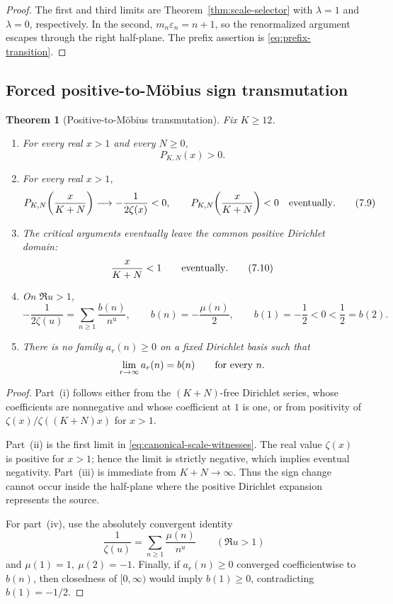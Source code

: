 \documentclass[11pt]{article}
\newtheorem{theorem}{Theorem}[section]
\theoremstyle{definition}
\theoremstyle{remark}
\begin{document}
\begin{proof}
The first and third limits are Theorem~\ref{thm:scale-selector} with
\(\lambda=1\) and \(\lambda=0\), respectively.  In the second,
\(m_n\varepsilon_n=n+1\), so the renormalized argument escapes through the right half-plane.
The prefix assertion is \eqref{eq:prefix-transition}.
\end{proof}

\subsection{Forced positive-to-M\"obius sign transmutation}

\begin{theorem}[Positive-to-M\"obius transmutation]\label{thm:positive-mobius}
Fix \(K\geq12\).
\begin{enumerate}[label=\textup{(\roman*)}]
\item For every real \(x>1\) and every \(N\geq0\),
\[
 P_{K,N}(x)>0.
 \]
\item For every real \(x>1\),
\begin{equation}
 P_{K,N}\!\left(\frac{x}{K+N}\right)
 \longrightarrow-\frac1{2\zeta(x)}<0,
 \qquad
 P_{K,N}\!\left(\frac{x}{K+N}\right)<0
 \quad\hbox{eventually}.
 \label{eq:positive-mobius-sign}
 \tag{7.9}
\end{equation}
\item The critical arguments eventually leave the common positive Dirichlet domain:
\[
 \frac{x}{K+N}<1\qquad\hbox{eventually}.
 \tag{7.10}
\]
\item On \(\Re u>1\),
\begin{equation}
 -\frac1{2\zeta(u)}
 =\sum_{n\geq1}\frac{b(n)}{n^u},
 \qquad
 b(n)=-\frac{\mu(n)}2,
 \qquad
 b(1)=-\frac12<0<\frac12=b(2).
 \label{eq:mobius-boundary-series}
 \tag{7.11}
\end{equation}
\item There is no family \(a_r(n)\geq0\) on a fixed Dirichlet basis such that
\[
 \lim_{r\to\infty}a_r(n)=b(n)
 \qquad\hbox{for every }n.
 \]
\end{enumerate}
\end{theorem}

\begin{proof}
Part~\textup{(i)} follows either from the \((K+N)\)-free Dirichlet series, whose coefficients
are nonnegative and whose coefficient at \(1\) is one, or from positivity of
\(\zeta(x)/\zeta((K+N)x)\) for \(x>1\).

Part~\textup{(ii)} is the first limit in
\eqref{eq:canonical-scale-witnesses}.  The real value \(\zeta(x)\) is positive for \(x>1\);
hence the limit is strictly negative, which implies eventual negativity.  Part~\textup{(iii)}
is immediate from \(K+N\to\infty\).  Thus the sign change cannot occur inside the half-plane
where the positive Dirichlet expansion represents the source.

For part~\textup{(iv)}, use the absolutely convergent identity
\[
 \frac1{\zeta(u)}=\sum_{n\geq1}\frac{\mu(n)}{n^u}
 \qquad(\Re u>1)
\]
and \(\mu(1)=1,\ \mu(2)=-1\).  Finally, if
\(a_r(n)\geq0\) converged coefficientwise to \(b(n)\), then closedness of
\([0,\infty)\) would imply \(b(1)\geq0\), contradicting \(b(1)=-1/2\).
\end{proof}
\end{document}
